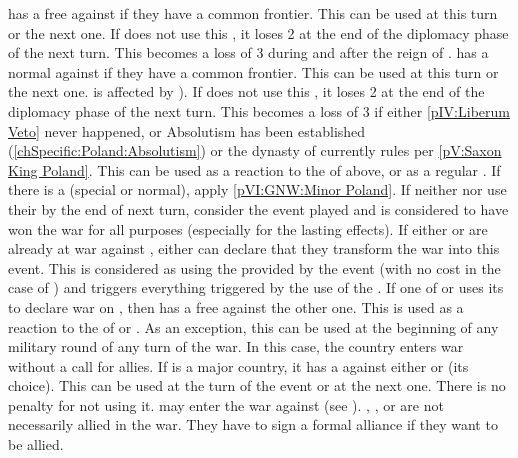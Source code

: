 \newpage\startevents





\phdipl
{} \RUS has a free \CB against \SUE if they
have a common frontier.
\bparag This \CB can be used at this turn or the next one.
\bparag If \RUS does not use this \CB, it loses 2 \STAB at the end of the
diplomacy phase of the next turn. This becomes a loss of 3 \STAB during and
after the reign of .
 \POLpol has a normal \CB against \SUE if
they have a common frontier.
\bparag This \CB can be used at this turn or the next one.
\bparag \POLpol is affected by ).
\bparag If \POL does not use this \CB, it loses 2 \STAB at the end of the
diplomacy phase of the next turn. This becomes a loss of 3 \STAB if either
\ref{pIV:Liberum Veto} never happened, or Absolutism has been established
(\ref{chSpecific:Poland:Absolutism}) or the dynasty of \payssaxe currently
rules \POL per \ref{pV:Saxon King Poland}.
\bparag This \CB can be used as a reaction to the \CB of \RUS above, or as a
regular \CB.
\bparag If there is a \POLmin (special or normal), apply \ref{pVI:GNW:Minor
  Poland}.
\aparag[Forfeit] If neither \RUS nor \POL use their \CB by the end of next
turn, consider the event played and \SUE is considered to have won the war for
all purposes (especially for the lasting effects).
\bparag If either \RUS or \POL are already at war against \SUE, either can
declare that they transform the war into this event. This is considered as
using the \CB provided by the event (with no \STAB cost in the case of \POL)
and triggers everything triggered by the use of the \CB.
 If one of \RUS or \POL uses its \CB
to declare war on \SUE, then \SUE has a free \CB against the other one.
\bparag This \CB is used as a reaction to the \CB of \RUS or \POL.
 As an exception, this \CB can be used at the
beginning of any military round of any turn of the war. In this case, the
country enters war without a call for allies.
 If \PRU is a major country, it has a \CB against
either \POL or \SUE (its choice).
\bparag This \CB can be used at the turn of the event or at the next
one. There is no penalty for not using it.
 \paysDanemark may enter the war against \SUE (see
).
\aparag[Alliances] \RUS, \POL, \PRU or \SUE are not necessarily allied in the
war. They have to sign a formal alliance if they want to be allied.


